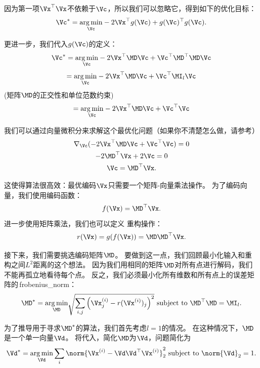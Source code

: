 因为第一项$\Vx^\top\Vx$不依赖于$\Vc$，所以我们可以忽略它，得到如下的优化目标：
\begin{equation}
\Vc^* = \underset{\Vc}{\arg\min} - 2\Vx^\top g(\Vc) + g(\Vc)^\top g(\Vc).
\end{equation}


更进一步，我们代入$g(\Vc)$的定义：
\begin{equation}
    \Vc^* = \underset{\Vc}{\arg\min} - 2\Vx^\top\MD\Vc + \Vc^\top\MD^\top\MD\Vc
\end{equation}
\begin{equation}
    = \underset{\Vc}{\arg\min} -2\Vx^\top\MD\Vc + \Vc^\top\MI_l\Vc
\end{equation}
(矩阵$\MD$的正交性和单位范数约束)
\begin{equation}
    = \underset{\Vc}{\arg\min} -2\Vx^\top\MD\Vc + \Vc^\top\Vc
\end{equation}


我们可以通过向量微积分来求解这个最优化问题（如果你不清楚怎么做，请参考）
\begin{gather}
    \nabla_{\Vc} (-2\Vx^\top \MD \Vc + \Vc^\top\Vc) = 0\\
    -2\MD^\top\Vx + 2\Vc = 0\\
    \Vc = \MD^\top \Vx.
\end{gather}


这使得算法很高效：最优编码$\Vx$只需要一个矩阵-向量乘法操作。
为了编码向量，我们使用编码函数：
\begin{equation}
    f(\Vx)=\MD^\top\Vx.
\end{equation}
进一步使用矩阵乘法，我们也可以定义\,\,重构操作：
\begin{equation}
    r(\Vx)=g(f(\Vx)) = \MD\MD^\top \Vx.
\label{eq:2.67}
\end{equation}


接下来，我们需要挑选编码矩阵$\MD$。
要做到这一点，我们回顾最小化输入和重构之间$L^2$距离的这个想法。
因为我们用相同的矩阵$\MD$对所有点进行解码，我们不能再孤立地看待每个点。
反之，我们必须最小化所有维数和所有点上的误差矩阵的\,\gls{frobenius_norm}：
\begin{equation}
    \MD^* =  \underset{\MD}{\arg\min} \sqrt{\sum_{i,j}\left( \Vx_j^{(i)} - r(\Vx^{(i)})_j\right)^2} \text{ subject to } \MD^\top\MD = \MI_l.
\label{eq:2.68}
\end{equation}

为了推导用于寻求$\MD^*$的算法，我们首先考虑$l=1$的情况。
在这种情况下，$\MD$是一个单一向量$\Vd$。
将代入，简化$\MD$为$\Vd$，问题简化为
\begin{equation}
    \Vd^* = \underset{\Vd}{\arg\min} \sum_i \norm{\Vx^{(i)} - \Vd\Vd^\top \Vx^{(i)}}_2^2
    \text{ subject to } \norm{\Vd}_2 = 1.
\end{equation}

